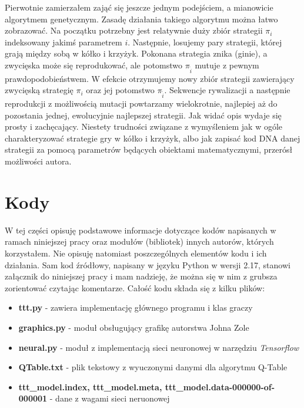 \documentclass[licencjacka]{pracamgr}
\begin{document}
Pierwotnie zamierzałem zająć się jeszcze jednym podejściem, a mianowicie algorytmem genetycznym. Zasadę działania takiego algorytmu można łatwo zobrazować. Na początku potrzebny jest relatywnie duży zbiór strategii $\pi_{i}$ indeksowany jakimś parametrem $i$. Następnie, losujemy pary strategii, której grają między sobą w kółko i krzyżyk. Pokonana strategia znika (ginie), a zwycięska może się reprodukować, ale potomstwo $\pi_{\tilde{i}}$ mutuje z pewnym prawdopodobieństwem. W efekcie otrzymujemy nowy zbiór strategii zawierający zwycięską strategię $\pi_{i}$ oraz jej potomstwo $\pi_{\tilde{i}}$.  Sekwencje rywalizacji a następnie reprodukcji z możliwością mutacji powtarzamy wielokrotnie, najlepiej aż do pozostania jednej, ewolucyjnie najlepszej strategii. Jak widać opis wydaje się prosty i zachęcający. Niestety trudności związane z wymyśleniem jak w ogóle charakteryzować strategie gry w kółko i krzyżyk, albo jak zapisać kod DNA danej strategii za pomocą parametrów będących obiektami matematycznymi, przerósł możliwości autora. 

\appendix

\chapter{Kody}
W tej części opisuję podstawowe informacje dotyczące kodów napisanych w ramach niniejszej pracy oraz modułów (bibliotek) innych autorów, których korzystałem.  Nie opisuję natomiast poszczególnych elementów kodu i ich działania. Sam kod źródłowy, napisany w języku Python w wersji 2.17, stanowi załącznik do niniejszej pracy i mam nadzieję, że można się w nim z grubsza zorientować czytając komentarze. Całość kodu składa się z kilku plików:
\begin{itemize}
	\item{\textbf{ttt.py} - zawiera implementację głównego programu i klas graczy}
	\item{\textbf{graphics.py} - moduł obsługujący grafikę autorstwa Johna Zole}
	\item{\textbf{neural.py} - moduł z implementacją sieci neuronowej w narzędziu \textit{Tensorflow}}
	\item{\textbf{QTable.txt} - plik tekstowy z wyuczonymi danymi dla algorytmu Q-Table}
	\item{ \textbf{ttt\_model.index, ttt\_model.meta, ttt\_model.data-000000-of-000001} - dane z wagami sieci neruonowej}
\end{itemize}
\end{document}
